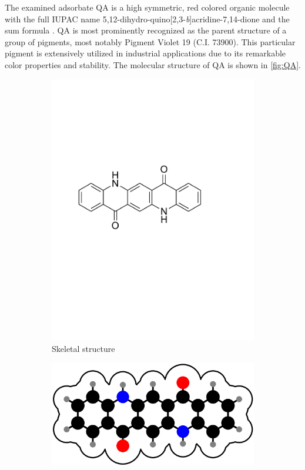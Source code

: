 The examined adsorbate \acf{QA} is a high symmetric, red colored organic molecule with the full IUPAC name 5,12-dihydro-quino[2,3-\textit{b}]acridine-7,14-dione and the sum formula .
\ac{QA} is most prominently recognized as the parent structure of a group of pigments, most notably Pigment Violet 19 (C.I. 73900). This particular pigment is extensively utilized in industrial applications due to its remarkable color properties and stability.\autocite{ChemicalBook2025,ChemSpider2025} The molecular structure of \ac{QA} is shown in \autoref{fig:QA}.

\begin{figure}[H]
	\centering
	\begin{subfigure}[b]{0.48\linewidth}
		\centering
		\includegraphics[width=\linewidth]{images/QA.pdf}
		\caption{Skeletal structure}
	\end{subfigure}
	\hfill
	\begin{subfigure}[b]{0.48\linewidth}
		\centering
		\includegraphics[width=\linewidth]{images/QA_molecule.png}

\end{subfigure}
\end{figure}
